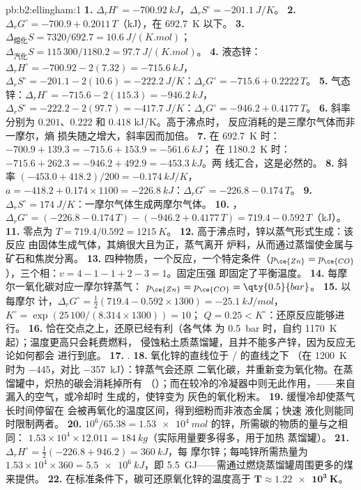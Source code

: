 \begin{solution}{pb:b2:ellingham:1}
\textbf{1.} $\Delta_r H^\circ = \qty{-700.92}{kJ}$，$\Delta_r S^\circ =
\qty{-201.1}{J/K}$。
\textbf{2.} $\Delta_r G^\circ = -700.9 + 0.2011\,T$（\unit{kJ}），在
\qty{692.7}{K} 以下。
\textbf{3.} $\Delta_{\text{熔化}}S = 7320/692.7 = \qty{10.6}{J/(K.mol)}$；
$\Delta_{\text{汽化}}S = 115\,300/1180.2 = \qty{97.7}{J/(K.mol)}$。
\textbf{4.} 液态锌：$\Delta_r H^\circ = -700.92 - 2(7.32) = \qty{-715.6}{kJ}$，
$\Delta_r S^\circ = -201.1 - 2(10.6) = \qty{-222.2}{J/K}$：$\Delta_r G^\circ =
-715.6 + 0.2222\,T$。
\textbf{5.} 气态锌：$\Delta_r H^\circ = -715.6 - 2(115.3) = \qty{-946.2}{kJ}$，
$\Delta_r S^\circ = -222.2 - 2(97.7) = \qty{-417.7}{J/K}$：$\Delta_r G^\circ =
-946.2 + 0.4177\,T$。
\textbf{6.} 斜率分别为 $0.201$、$0.222$ 和 $0.418$ \unit{kJ/K}。高于沸点时，
反应消耗的是三摩尔气体而非一摩尔，熵
损失随之增大，斜率因而加倍。
\textbf{7.} 在 \qty{692.7}{K} 时：$-700.9 + 139.3 = -715.6 + 153.9 = \qty{-561.6}{kJ}$；
在 \qty{1180.2}{K} 时：$-715.6 + 262.3 = -946.2 + 492.9 = \qty{-453.3}{kJ}$。两
线汇合，这是必然的。
\textbf{8.} 斜率 $(-453.0 + 418.2)/200 = \qty{-0.174}{kJ/K}$，$a = -418.2 +
0.174 \times 1100 = \qty{-226.8}{kJ}$：$\Delta_r G^\circ = -226.8 - 0.174\,T$。
\textbf{9.} $\Delta_r S^\circ = \qty{+174}{J/K}$：一摩尔气体生成两摩尔气体。
\textbf{10.} ，$\Delta_r G^\circ = (-226.8 - 0.174\,T)
- (-946.2 + 0.4177\,T) = 719.4 - 0.592\,T$（\unit{kJ}）。
\textbf{11.} 零点为 $T = 719.4/0.592 = \qty{1215}{K}$。
\textbf{12.} 高于沸点时，锌以蒸气形式生成：该反应
由固体生成气体，其熵很大且为正，蒸气离开
炉料，从而通过蒸馏使金属与矿石和焦炭分离。
\textbf{13.} 四种物质，一个反应，一个特定条件（$p_{\ce{Zn}} =
p_{\ce{CO}}$），三个相：$v = 4 - 1 - 1 + 2 - 3 = 1$。固定压强
即固定了平衡温度。
\textbf{14.} 每摩尔一氧化碳对应一摩尔锌蒸气：
$p_{\ce{Zn}} = p_{\ce{CO}} = \qty{0.5}{bar}$。
\textbf{15.} 以每摩尔  计，$\Delta_r G^\circ = \frac12(719.4 - 0.592 \times
1300) = \qty{-25.1}{kJ/mol}$，$K^\circ = \exp(25\,100/(8.314 \times 1300)) = 10$；
$Q = 0.25 < K^\circ$：还原反应能够进行。
\textbf{16.} 恰在交点之上，还原已经有利（各气体
为 \qty{0.5}{bar} 时，自约 \qty{1170}{K} 起）；温度更高只会耗费燃料，
侵蚀粘土质蒸馏罐，且并不能多产锌，因为反应无论如何都会
进行到底。
\textbf{17.} .
\textbf{18.} 氧化锌的直线位于 / 的直线之下
（在 \qty{1200}{K} 时为 $-445$，对比 \qty{-357}{kJ}）：锌蒸气会还原
二氧化碳，并重新变为氧化物。在蒸馏罐中，炽热的碳会消耗掉所有
（）；而在较冷的冷凝器中则无此作用，——来自
漏入的空气，或冷却时  生成的，使锌变为
灰色的氧化粉末。
\textbf{19.} 缓慢冷却使蒸气长时间停留在
会被再氧化的温度区间，得到细粉而非液态金属；快速
液化则能同时限制两者。
\textbf{20.} $10^6/65.38 = \qty{1.53e4}{mol}$ 的锌，所需碳的物质的量与之相同：
$1.53 \times 10^4 \times 12.011 = \qty{184}{kg}$（实际用量要多得多，用于加热
蒸馏罐）。
\textbf{21.} $\Delta_r H^\circ = \frac12(-226.8 + 946.2) = \qty{+360}{kJ}$，每
摩尔锌；每吨锌所需热量为 $1.53 \times 10^4 \times 360 = \qty{5.5e6}{kJ}$，即
\qty{5.5}{GJ}——需通过燃烧蒸馏罐周围更多的煤来提供。
\textbf{22.} 在标准条件下，碳可还原氧化锌的温度高于
$\boldsymbol{T \approx \qty{1.22e3}{K}}$。
\end{solution}

